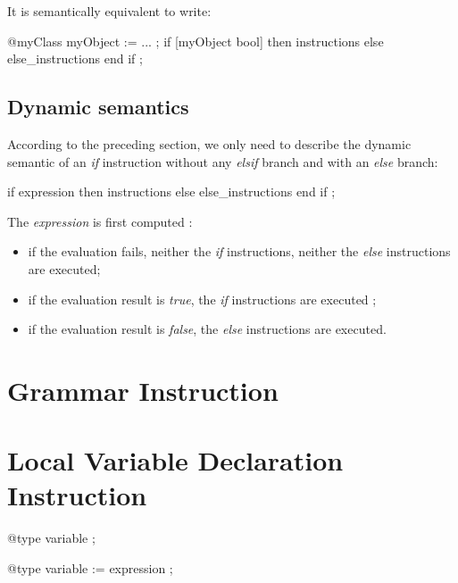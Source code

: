 It is semantically equivalent to write:
{
\begin{galgascode}
@myClass myObject := ... ;
if [myObject bool] then
  instructions
else
  else_instructions
end if ;
\end{galgascode}
}


\subsection{Dynamic semantics}

According to the preceding section, we only need to describe the dynamic semantic of an \emph{if} instruction without any \emph{elsif} branch and with an \emph{else} branch:
{
\begin{galgascode}
if expression then
  instructions
else
  else_instructions
end if ;  
\end{galgascode}
}



The \emph{expression} is first computed :
\begin{itemize}
\item if the evaluation fails, neither the \emph{if} instructions, neither the \emph{else} instructions are executed;
\item if the evaluation result is \emph{true}, the \emph{if} instructions are executed ;
\item if the evaluation result is \emph{false}, the \emph{else} instructions are executed.
\end{itemize}


\section{Grammar Instruction}

\section{Local Variable Declaration Instruction}


{
\begin{galgascode}
@type variable ;
\end{galgascode}
}

{
\begin{galgascode}
@type variable := expression ;
\end{galgascode}
}

